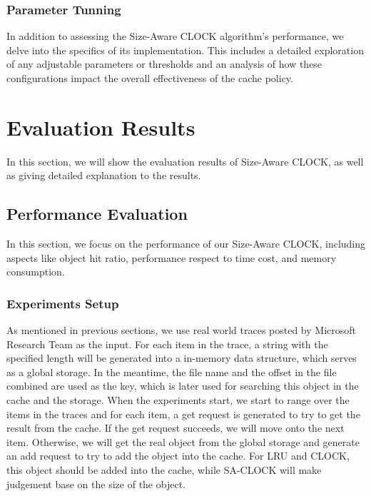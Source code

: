 \documentclass[journal,10.5pt,onecolumn]{IEEEtran}
\begin{document}
\subsubsection{Parameter Tunning}
In addition to assessing the Size-Aware CLOCK algorithm's performance, we delve into the specifics of its implementation. This includes a detailed exploration of any adjustable parameters or thresholds and an analysis of how these configurations impact the overall effectiveness of the cache policy.



\section{Evaluation Results}
In this section, we will show the evaluation results of Size-Aware CLOCK, as well as giving detailed explanation to the results.

\subsection{Performance Evaluation}
In this section, we focus on the performance of our Size-Aware CLOCK, including aspects like object hit ratio, performance respect to time cost, and memory consumption.

\subsubsection{Experiments Setup}
As mentioned in previous sections, we use real world traces posted by Microsoft Research Team as the input. For each item in the trace, a string with the specified length will be generated into a in-memory data structure, which serves as a global storage. In the meantime, the file name and the offset in the file combined are used as the key, which is later used for searching this object in the cache and the storage. 
When the experiments start, we start to range over the items in the traces and for each item, a get request is generated to try to get the result from the cache. If the get request succeeds, we will move onto the next item. Otherwise, we will get the real object from the global storage and generate an add request to try to add the object into the cache. For LRU and CLOCK, this object should be added into the cache, while SA-CLOCK will make judgement base on the size of the object.
\end{document}
